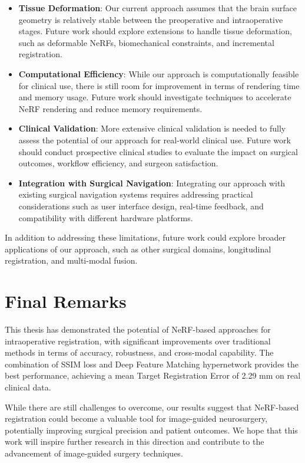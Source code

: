 \begin{itemize}
    \item \textbf{Tissue Deformation}: Our current approach assumes that the brain surface geometry is relatively stable between the preoperative and intraoperative stages. Future work should explore extensions to handle tissue deformation, such as deformable NeRFs, biomechanical constraints, and incremental registration.
    
    \item \textbf{Computational Efficiency}: While our approach is computationally feasible for clinical use, there is still room for improvement in terms of rendering time and memory usage. Future work should investigate techniques to accelerate NeRF rendering and reduce memory requirements.
    
    \item \textbf{Clinical Validation}: More extensive clinical validation is needed to fully assess the potential of our approach for real-world clinical use. Future work should conduct prospective clinical studies to evaluate the impact on surgical outcomes, workflow efficiency, and surgeon satisfaction.
    
    \item \textbf{Integration with Surgical Navigation}: Integrating our approach with existing surgical navigation systems requires addressing practical considerations such as user interface design, real-time feedback, and compatibility with different hardware platforms.
\end{itemize}

In addition to addressing these limitations, future work could explore broader applications of our approach, such as other surgical domains, longitudinal registration, and multi-modal fusion.

\section{Final Remarks}

This thesis has demonstrated the potential of NeRF-based approaches for intraoperative registration, with significant improvements over traditional methods in terms of accuracy, robustness, and cross-modal capability. The combination of SSIM loss and Deep Feature Matching hypernetwork provides the best performance, achieving a mean Target Registration Error of 2.29 mm on real clinical data.

While there are still challenges to overcome, our results suggest that NeRF-based registration could become a valuable tool for image-guided neurosurgery, potentially improving surgical precision and patient outcomes. We hope that this work will inspire further research in this direction and contribute to the advancement of image-guided surgery techniques.

